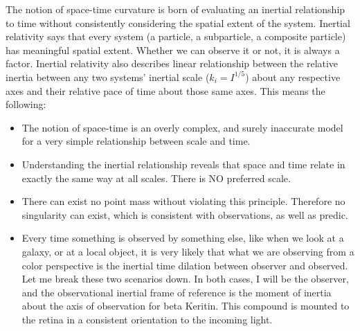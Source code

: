 The notion of space-time curvature is born of evaluating an inertial relationship to time without consistently considering the spatial extent of the system. Inertial relativity says that every system (a particle, a subparticle, a composite particle) has meaningful spatial extent. Whether we can observe it or not, it is always a factor. Inertial relativity also describes linear relationship between the relative inertia between any two systems' inertial scale ($k_i = I^{1/5}$) about any respective axes and their relative pace of time about those same axes. This means the following:
\begin{itemize}[leftmargin=0.5cm]
    \item The notion of space-time is an overly complex, and surely inaccurate model for a very simple relationship between scale and time.
    \item Understanding the inertial relationship reveals that space and time relate in exactly the same way at all scales. There is NO preferred scale.
    \item There can exist no point mass without violating this principle. Therefore no singularity can exist, which is consistent with observations, as well as predic.
    \item Every time something is observed by something else, like when we look at a galaxy, or at a local object, it is very likely that what we are observing from a color perspective is the inertial time dilation between observer and observed. Let me break these two scenarios down. In both cases, I will be the observer, and the observational inertial frame of reference is the moment of inertia about the axis of observation for beta Keritin. This compound is mounted to the retina in a consistent orientation to the incoming light.
\end{itemize}

